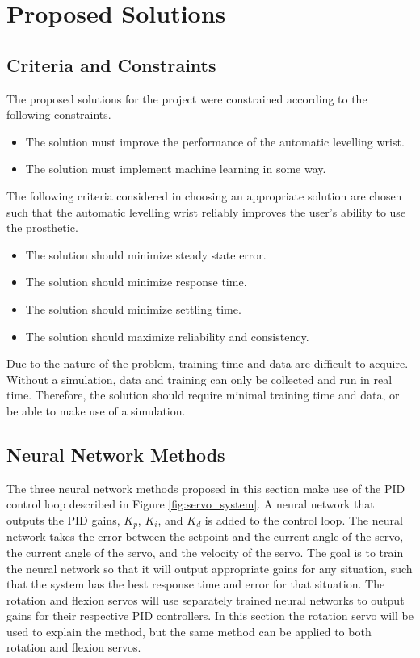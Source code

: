\documentclass[letterpaper,12pt]{article}
\begin{document}
\section{Proposed Solutions}
\subsection{Criteria and Constraints}

The proposed solutions for the project were constrained according to the following constraints.
\begin{itemize}
		\item The solution must improve the performance of the automatic levelling wrist.
    \item The solution must implement machine learning in some way.

\end{itemize}

The following criteria considered in choosing an appropriate solution are chosen such that the automatic levelling wrist reliably improves the user's ability to use the prosthetic.
\begin{itemize}
    \item The solution should minimize steady state error.
		\item The solution should minimize response time.
		\item The solution should minimize settling time.
		\item The solution should maximize reliability and consistency.
\end{itemize}
Due to the nature of the problem, training time and data are difficult to acquire. Without a simulation, data and training can only be collected and run in real time. Therefore, the solution should require minimal training time and data, or be able to make use of a simulation.

\subsection{Neural Network Methods}
The three neural network methods proposed in this section make use of the PID control loop described in Figure \ref{fig:servo_system}. A neural network that outputs the PID gains, $K_p$, $K_i$, and $K_d$ is added to the control loop. The neural network takes the error between the setpoint and the current angle of the servo, the current angle  of the servo, and the velocity of the servo. The goal is to train the neural network so that it will output appropriate gains for any situation, such that the system has the best response time and error for that situation. The rotation and flexion servos will use separately trained neural networks to output gains for their respective PID controllers. In this section the rotation servo will be used to explain the method, but the same method can be applied to both rotation and flexion servos.
\end{document}
